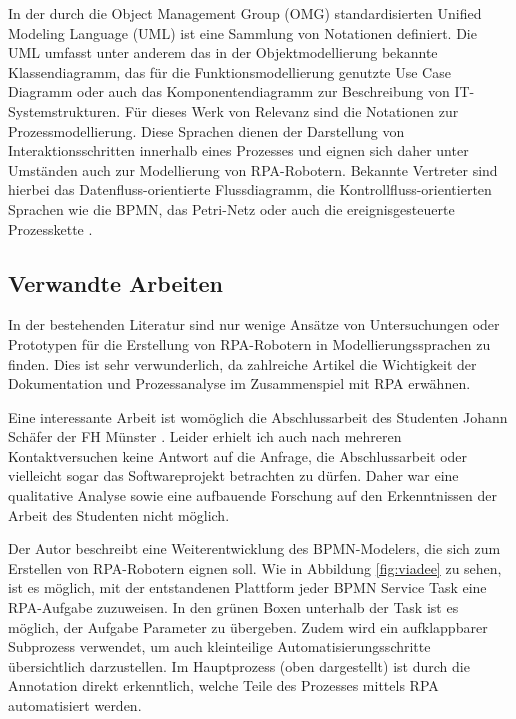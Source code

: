 In der durch die Object Management Group (OMG) standardisierten Unified Modeling Language (UML) ist eine Sammlung von Notationen definiert. Die UML umfasst unter anderem das in der Objektmodellierung bekannte Klassendiagramm, das für die Funktionsmodellierung genutzte Use Case Diagramm oder auch das Komponentendiagramm zur Beschreibung von IT-Systemstrukturen. Für dieses Werk von Relevanz sind  die Notationen zur Prozessmodellierung. Diese Sprachen dienen der Darstellung von Interaktionsschritten innerhalb eines Prozesses und eignen sich daher unter Umständen auch zur Modellierung von RPA-Robotern. Bekannte Vertreter sind hierbei das Datenfluss-orientierte Flussdiagramm, die Kontrollfluss-orientierten Sprachen wie die BPMN, das Petri-Netz oder auch die ereignisgesteuerte Prozesskette \cite{mastersthesisLobe}.

\subsection{Verwandte Arbeiten}

In der bestehenden Literatur sind nur wenige Ansätze von Untersuchungen oder Prototypen für die Erstellung von RPA-Robotern in Modellierungssprachen zu finden. Dies ist sehr verwunderlich, da zahlreiche Artikel \cite{alejandro}\cite{rpameetsbpmn} die Wichtigkeit der Dokumentation und Prozessanalyse im Zusammenspiel mit RPA erwähnen.

\clearpage

Eine interessante Arbeit ist womöglich die Abschlussarbeit des Studenten Johann Schäfer der FH Münster \cite{Viadee}. Leider erhielt ich auch nach mehreren Kontaktversuchen keine Antwort auf die Anfrage, die Abschlussarbeit oder vielleicht sogar das Softwareprojekt betrachten zu dürfen. Daher war eine qualitative Analyse sowie eine aufbauende Forschung auf den Erkenntnissen der Arbeit des Studenten nicht möglich.

Der Autor beschreibt eine Weiterentwicklung des  BPMN-Modelers, die sich zum Erstellen von RPA-Robotern eignen soll. Wie in Abbildung \ref{fig:viadee} zu sehen, ist es möglich, mit der entstandenen Plattform jeder BPMN Service Task eine RPA-Aufgabe zuzuweisen. In den grünen Boxen unterhalb der Task ist es möglich, der Aufgabe Parameter zu übergeben. Zudem wird ein aufklappbarer Subprozess verwendet, um auch kleinteilige Automatisierungsschritte übersichtlich darzustellen. Im Hauptprozess (oben dargestellt) ist durch die Annotation direkt erkenntlich, welche Teile des Prozesses mittels RPA automatisiert werden.

